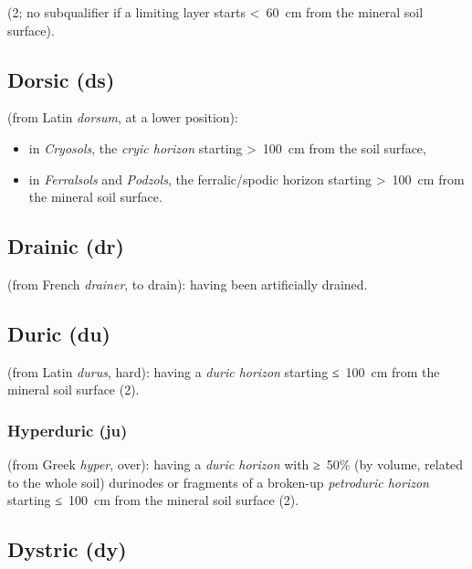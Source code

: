 \documentclass[
  letterpaper,
  DIV=11,
  numbers=noendperiod]{scrreprt}
\providecommand{\tightlist}{%
  \setlength{\itemsep}{0pt}\setlength{\parskip}{0pt}}\usepackage{longtable,booktabs,array}
\begin{document}
(2; no subqualifier if a limiting layer starts \textless~60~cm from the
mineral soil surface).

\hypertarget{dorsic-ds}{%
\subsection{Dorsic (ds)}\label{dorsic-ds}}

(from Latin \emph{dorsum}, at a lower position):

\begin{itemize}
\tightlist
\item
  in \emph{Cryosols}, the \emph{cryic horizon} starting
  \textgreater~100~cm from the soil surface,
\item
  in \emph{Ferralsols} and \emph{Podzols}, the ferralic/spodic horizon
  starting \textgreater~100~cm from the mineral soil surface.
\end{itemize}

\hypertarget{drainic-dr}{%
\subsection{Drainic (dr)}\label{drainic-dr}}

(from French \emph{drainer}, to drain): having been artificially
drained.

\hypertarget{duric-du}{%
\subsection{Duric (du)}\label{duric-du}}

(from Latin \emph{durus}, hard): having a \emph{duric horizon} starting
≤~100~cm from the mineral soil surface (2).

\hypertarget{hyperduric-ju}{%
\subsubsection{Hyperduric (ju)}\label{hyperduric-ju}}

(from Greek \emph{hyper}, over): having a \emph{duric horizon} with
≥~50\% (by volume, related to the whole soil) durinodes or fragments of
a broken-up \emph{petroduric horizon} starting ≤~100~cm from the mineral
soil surface (2).

\hypertarget{dystric-dy}{%
\subsection{Dystric (dy)}\label{dystric-dy}}
\end{document}
